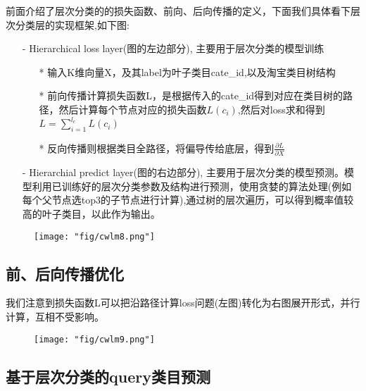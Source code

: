 前面介绍了层次分类的的损失函数、前向、后向传播的定义，下面我们具体看下层次分类层的实现框架,如下图:
\begin{itemize}
\item[-] Hierarchical loss layer(图的左边部分), 主要用于层次分类的模型训练
\begin{itemize}
\item[*] 输入K维向量X，及其label为叶子类目cate\_id,以及淘宝类目树结构
\item[*] 前向传播计算损失函数L，是根据传入的cate\_id得到对应在类目树的路径，然后计算每个节点对应的损失函数$L(c_{i})$,然后对loss求和得到$L=\sum_{i=1}^{l_{c}}L(c_{i})$
\item[*] 反向传播则根据类目全路径，将偏导传给底层，得到$\frac{\partial L}{\partial X}$
\end{itemize}
\item[-] Hierarchial predict layer(图的右边部分), 主要用于层次分类的模型预测。模型利用已训练好的层次分类参数及结构进行预测，使用贪婪的算法处理(例如每个父节点选top3的子节点进行计算),通过树的层次遍历，可以得到概率值较高的叶子类目，以此作为输出。
\end{itemize}

\begin{figure}[!h]
	\centering
	\texttt{[image: "fig/cwlm8.png"]}
	\caption{}
	\label{fig:cwlm8}
\end{figure}

\subsection{前、后向传播优化}
我们注意到损失函数L可以把沿路径计算loss问题(左图)转化为右图展开形式，并行计算，互相不受影响。

\begin{figure}[!h]
	\centering
	\texttt{[image: "fig/cwlm9.png"]}
	\caption{}
	\label{fig:cwlm9}
\end{figure}

\subsection{基于层次分类的query类目预测}

